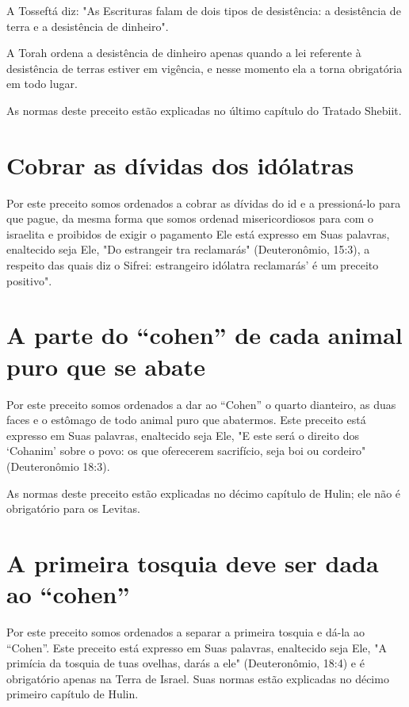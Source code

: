A Tosseftá diz: "As Escrituras falam de dois tipos de desistência: a
desistência de terra e a desistência de dinheiro".

A Torah ordena a desistência de dinheiro apenas quando a lei refe­rente
à desistência de terras estiver em vigência, e nesse momento ela a torna
obrigatória em todo lugar.

As normas deste preceito estão explicadas no último capítulo do Tra­tado
Shebiit.

\section{Cobrar as dívidas dos idólatras}

Por este preceito somos ordenados a cobrar as dívidas do id e a
pressioná-lo para que pague, da mesma forma que somos ordenad
misericordiosos para com o israelita e proibidos de exigir o pagamento
Ele está expresso em Suas palavras, enaltecido seja Ele, "Do estrangeir
tra reclamarás" (Deuteronômio, 15:3), a respeito das quais diz o Sifrei:
estrangeiro idólatra reclamarás' é um preceito positivo".

\section{A parte do ``cohen'' de cada animal puro que se abate}

Por este preceito somos ordenados a dar ao ``Cohen'' o quarto dian­teiro,
as duas faces e o estômago de todo animal puro que abatermos. Este
pre­ceito está expresso em Suas palavras, enaltecido seja Ele, "E este
será o direito dos `Cohanim' sobre o povo: os que oferecerem sacrifício,
seja boi ou cordei­ro" (Deuteronômio 18:3).

As normas deste preceito estão explicadas no décimo capítulo de Hu­lin;
ele não é obrigatório para os Levitas.

\section{A primeira tosquia deve ser dada ao ``cohen''}

Por este preceito somos ordenados a separar a primeira tosquia e dá-la
ao ``Cohen''. Este preceito está expresso em Suas palavras, enaltecido
seja Ele, "A primícia da tosquia de tuas ovelhas, darás a ele"
(Deuteronômio, 18:4) e é obrigatório apenas na Terra de Israel. Suas
normas estão explicadas no décimo primeiro capítulo de Hulin.

